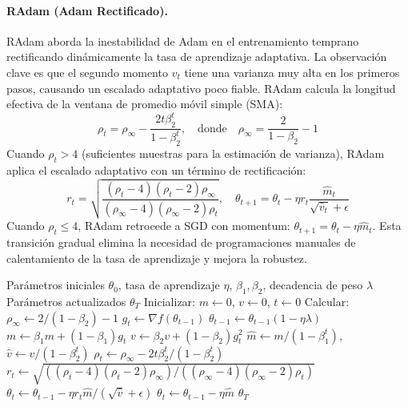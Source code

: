 \paragraph{RAdam (Adam Rectificado).}
RAdam aborda la inestabilidad de Adam en el entrenamiento temprano rectificando dinámicamente la tasa de aprendizaje adaptativa. La observación clave es que el segundo momento $v_t$ tiene una varianza muy alta en los primeros pasos, causando un escalado adaptativo poco fiable. RAdam calcula la longitud efectiva de la ventana de promedio móvil simple (SMA):
\[\rho_t = \rho_{\infty} - \frac{2t\beta_2^t}{1-\beta_2^t}, \quad \text{donde} \quad \rho_{\infty} = \frac{2}{1-\beta_2}-1\]
Cuando $\rho_t > 4$ (suficientes muestras para la estimación de varianza), RAdam aplica el escalado adaptativo con un término de rectificación:
\[r_t = \sqrt{\frac{(\rho_t-4)(\rho_t-2)\rho_{\infty}}{(\rho_{\infty}-4)(\rho_{\infty}-2)\rho_t}}, \quad \theta_{t+1} = \theta_t - \eta r_t \frac{\hat{m}_t}{\sqrt{\hat{v}_t}+\epsilon}\]
Cuando $\rho_t \leq 4$, RAdam retrocede a SGD con momentum: $\theta_{t+1} = \theta_t - \eta\hat{m}_t$. Esta transición gradual elimina la necesidad de programaciones manuales de calentamiento de la tasa de aprendizaje y mejora la robustez.

\begin{algorithm}[H]
\caption{RAdam (Adam Rectificado)}
\label{alg:radam}
\begin{algorithmic}[1]
\Require Parámetros iniciales $\theta_0$, tasa de aprendizaje $\eta$, $\beta_1, \beta_2$, decadencia de peso $\lambda$
\Ensure Parámetros actualizados $\theta_T$
\State Inicializar: $m \gets 0$, $v \gets 0$, $t \gets 0$
\State Calcular: $\rho_\infty \gets 2/(1-\beta_2) - 1$
    \State $g_t \gets \nabla f(\theta_{t-1})$
        \State $\theta_{t-1} \gets \theta_{t-1}(1 - \eta\lambda)$
    \EndIf
    \State $m \gets \beta_1 m + (1-\beta_1) g_t$
    \State $v \gets \beta_2 v + (1-\beta_2) g_t^2$
    \State $\hat{m} \gets m/(1-\beta_1^t)$, $\hat{v} \gets v/(1-\beta_2^t)$
    \State $\rho_t \gets \rho_\infty - 2t \beta_2^t / (1 - \beta_2^t)$
        \State $r_t \gets \sqrt{((\rho_t-4)(\rho_t-2)\rho_\infty) / ((\rho_\infty-4)(\rho_\infty-2)\rho_t)}$
        \State $\theta_t \gets \theta_{t-1} - \eta r_t \hat{m} / (\sqrt{\hat{v}} + \epsilon)$
    \Else
        \State $\theta_t \gets \theta_{t-1} - \eta \hat{m}$ 
    \EndIf
\EndFor
\Return $\theta_T$
\end{algorithmic}
\end{algorithm}

